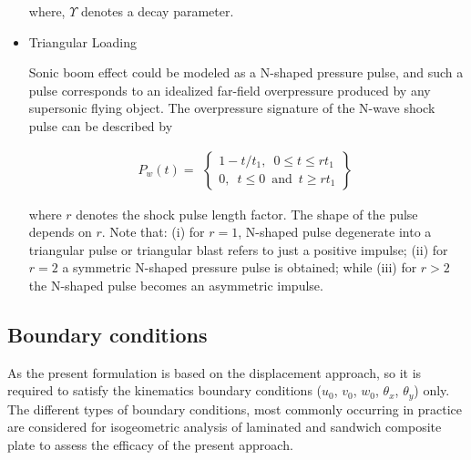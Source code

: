 \documentclass[3p,preprint,12pt]{elsarticle}
\begin{document}
\begin{itemize}
	where, $\Upsilon$ denotes a decay parameter. 
	
	\item Triangular Loading
	
	Sonic boom effect could be modeled as a N-shaped pressure pulse, and such a pulse corresponds to an idealized far-field overpressure produced by any supersonic flying object. The overpressure signature of the N-wave shock pulse can be described by
	
	\begin{equation} 
	P_{w}(t)=\begin{array}{cc}
	\left\{ \begin{array}{c}
	1-t/t_{1},\,\,\,0\leq t\leq rt_{1}\\
	0,\,\,\,t \leq 0\,\,\, \text{and}\,\,\, t \geq rt_{1}
	\end{array}\right\} %
	\end{array}
	\end{equation}
	
	where $r$ denotes the shock pulse length factor. The shape of the pulse depends on $r$. Note that: (i) for $r=1$, N-shaped pulse degenerate into a triangular pulse or triangular blast refers to just a positive impulse; (ii) for $r=2$ a symmetric N-shaped pressure pulse is obtained; while (iii) for $r>2$ the N-shaped pulse becomes an asymmetric impulse.
\end{itemize}

\subsection{Boundary conditions}

As the present formulation is based on the displacement approach, so it is required to satisfy the kinematics boundary conditions ($u_0$, $v_0$, $w_0$, $\theta_x$, $\theta_y$) only. The different types of boundary conditions, most commonly occurring in practice are considered for isogeometric analysis of laminated and sandwich composite plate to assess the efficacy of the present approach.
\end{document}
